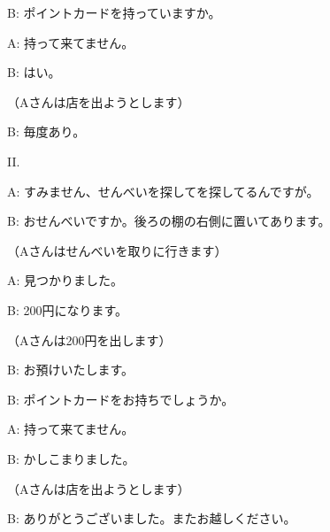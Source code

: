 	B: ポイントカードを持っていますか。

	A: 持って来てません。

	B: はい。

	（Aさんは店を出ようとします）

	B: 毎度あり。
	
	II.
	
	A: すみません、せんべいを探してを探してるんですが。
	
	B: おせんべいですか。後ろの棚の右側に置いてあります。
	
	（Aさんはせんべいを取りに行きます）
	
	A: 見つかりました。
	
	B: 200円になります。
	
	（Aさんは200円を出します）
	
	B: お預けいたします。

	B: ポイントカードをお持ちでしょうか。

	A: 持って来てません。

	B: かしこまりました。

	（Aさんは店を出ようとします）

	B: ありがとうございました。またお越しください。
	
	
	
	

